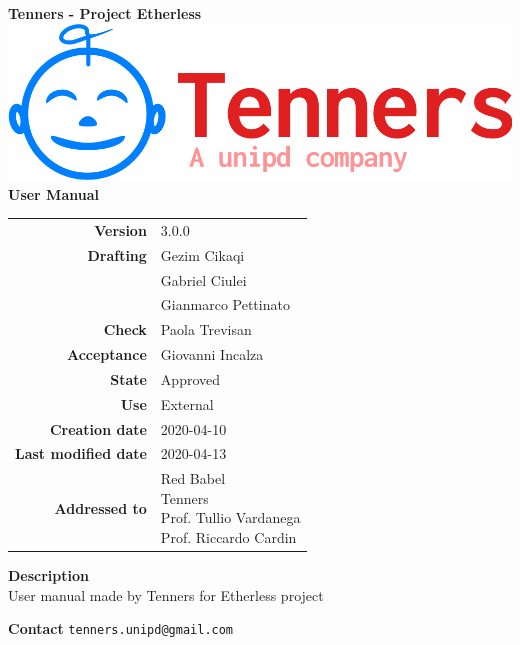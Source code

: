 \begin{titlepage}
	\begin{center}
		\large \textbf{Tenners - Project Etherless}
		\vfill
		\includegraphics[scale = 0.3]{./res/img/logo.png}\\
		\vfill
		\Huge \textbf{User Manual}

        \vfill
        \large

        \begin{tabular}{r|l}
                        \textbf{Version} & 3.0.0 \\
                        \textbf{Drafting} &
                        Gezim Cikaqi\\&
                        Gabriel Ciulei\\&
						Gianmarco Pettinato\\
                        \textbf{Check} &
                        Paola Trevisan\\
                        \textbf{Acceptance} &
                        Giovanni Incalza\\
                        \textbf{State} & Approved \\
                        \textbf{Use} & External\\
                        \textbf{Creation date} &  2020-04-10\\
                        \textbf{Last modified date} &  2020-04-13\\
                        \textbf{Addressed to} & \parbox[t]{5cm}{Red Babel \\Tenners \\Prof. Tullio Vardanega \\Prof. Riccardo Cardin
                        							}
                \end{tabular}
                \vfill
                \normalsize
                \vfill
                                \textbf{Description}
                \\User manual made by Tenners for Etherless project
                \vfill
                \normalsize
                \vfill
                
                \textbf{Contact}
                \texttt{tenners.unipd@gmail.com}

	\end{center}
\end{titlepage}
